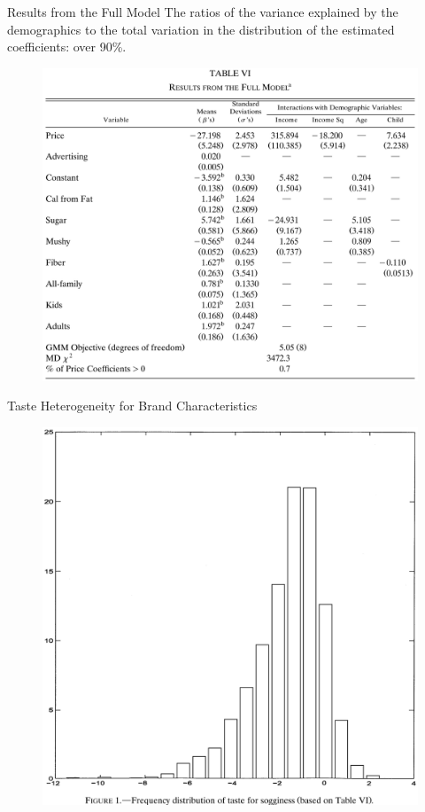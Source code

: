 \documentclass{beamer}
\begin{document}
\begin{frame}[label=table6]{Results from the Full Model}
	The ratios of the variance explained by the demographics to the total variation in the distribution of the estimated coefficients: over 90\%.
	\begin{figure}[h]
		\centering
		\includegraphics[scale=0.19]{table6.png}
	\end{figure}
\end{frame}
\begin{frame}{Taste Heterogeneity for Brand Characteristics}
	\begin{figure}[h]
		\centering
		\includegraphics[scale=0.21]{figure1.png}
	\end{figure}
\end{frame}
\end{document}
